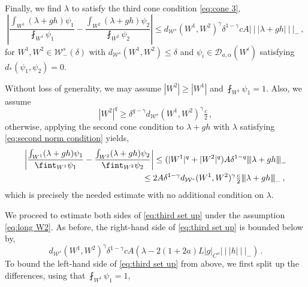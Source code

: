 \documentclass{amsart}
\numberwithin{equation}{section}
\newcommand\cD{{\mathcal D}}
\newcommand\cW{{\mathcal W}}
\newcommand{\tri}{{|\:\!\!|\:\!\!|}}
\begin{document}
Finally, we find $\lambda$ to satisfy the third cone condition \eqref{eq:cone 3},
\begin{equation}
\label{eq:third set up}
\left| \frac{\int_{W^1} (\lambda + gh) \psi_1}{\fint_{W^1} \psi_1} - \frac{\int_{W^2} (\lambda + gh) \psi_2}{\fint_{W^2} \psi_2} \right|
\le d_{\cW^s}(W^1, W^2)^\gamma \delta^{1-\gamma} cA \tri \lambda + gh \tri_- \, ,
\end{equation}
for $W^1, W^2 \in \cW^s_-(\delta)$ with $d_{\cW^s}(W^1, W^2) \le \delta$ and
$\psi_i \in \cD_{a,\alpha}(W^i)$ satisfying $d_*(\psi_1, \psi_2) =0$.

Without loss of generality, we may assume $|W^2| \ge |W^1|$ and $\fint_{W^1} \psi_1 = 1$.
Also, we assume  
\begin{equation}
\label{eq:long W2}
|W^2|^q \ge \delta^{q-\gamma} d_{\cW^s}(W^1, W^2)^\gamma \tfrac c2 \, ,
\end{equation}
otherwise, applying the second cone condition to $\lambda + gh$ with $\lambda$ satisfying \eqref{eq:second norm condition} yields,
\begin{equation}
\label{eq:trivial small}
\begin{split}
\left| \frac{\int_{W^1} (\lambda + gh) \psi_1}{\fint_{W^1} \psi_1} - \frac{\int_{W^2} (\lambda + gh) \psi_2}{\fint_{W^2} \psi_2} \right|
& \le (|W^1|^q + |W^2|^q) A \delta^{1-q} \tri \lambda + gh \tri_- \\
&\hskip-.5cm \le 2 A \delta^{1-\gamma} d_{\cW^s}(W^1, W^2)^\gamma \tfrac c2 \tri \lambda + gh \tri_- \, ,
\end{split}
\end{equation}
which is precisely the needed estimate with no additional condition on $\lambda$.

We proceed to estimate both sides of \eqref{eq:third set up} under the assumption \eqref{eq:long W2}.
As before, the right-hand side of \eqref{eq:third set up} is bounded below by,
\begin{equation}
\label{eq:lower third}
d_{\cW^s}(W^1, W^2)^\gamma \delta^{1-\gamma} cA (\lambda - 2(1+2a)L |g|_{C^\alpha} \tri h \tri_- ) \, .
\end{equation}
To bound the left-hand side of \eqref{eq:third set up} from above, 
we first split up the differences, using that $\fint_{W^1} \psi_1 = 1$, 
\end{document}
